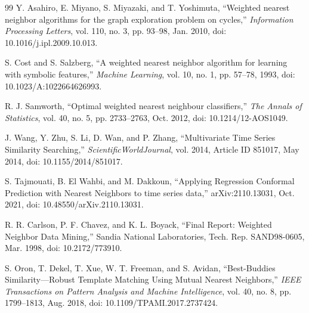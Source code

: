 \begin{thebibliography}{99}
Y. Asahiro, E. Miyano, S. Miyazaki, and T. Yoshimuta, ``Weighted nearest neighbor algorithms for the graph exploration problem on cycles,'' \emph{Information Processing Letters}, vol. 110, no. 3, pp. 93--98, Jan. 2010, doi: 10.1016/j.ipl.2009.10.013.

S. Cost and S. Salzberg, ``A weighted nearest neighbor algorithm for learning with symbolic features,'' \emph{Machine Learning}, vol. 10, no. 1, pp. 57--78, 1993, doi: 10.1023/A:1022664626993.

R. J. Samworth, ``Optimal weighted nearest neighbour classifiers,'' \emph{The Annals of Statistics}, vol. 40, no. 5, pp. 2733--2763, Oct. 2012, doi: 10.1214/12-AOS1049.

J. Wang, Y. Zhu, S. Li, D. Wan, and P. Zhang, ``Multivariate Time Series Similarity Searching,'' \emph{ScientificWorldJournal}, vol. 2014, Article ID 851017, May 2014, doi: 10.1155/2014/851017.

S. Tajmouati, B. El Wahbi, and M. Dakkoun, ``Applying Regression Conformal Prediction with Nearest Neighbors to time series data,'' arXiv:2110.13031, Oct. 2021, doi: 10.48550/arXiv.2110.13031.

R. R. Carlson, P. F. Chavez, and K. L. Boyack, ``Final Report: Weighted Neighbor Data Mining,'' Sandia National Laboratories, Tech. Rep. SAND98-0605, Mar. 1998, doi: 10.2172/773910.

S. Oron, T. Dekel, T. Xue, W. T. Freeman, and S. Avidan, ``Best-Buddies Similarity---Robust Template Matching Using Mutual Nearest Neighbors,'' \emph{IEEE Transactions on Pattern Analysis and Machine Intelligence}, vol. 40, no. 8, pp. 1799--1813, Aug. 2018, doi: 10.1109/TPAMI.2017.2737424.


\end{thebibliography}
